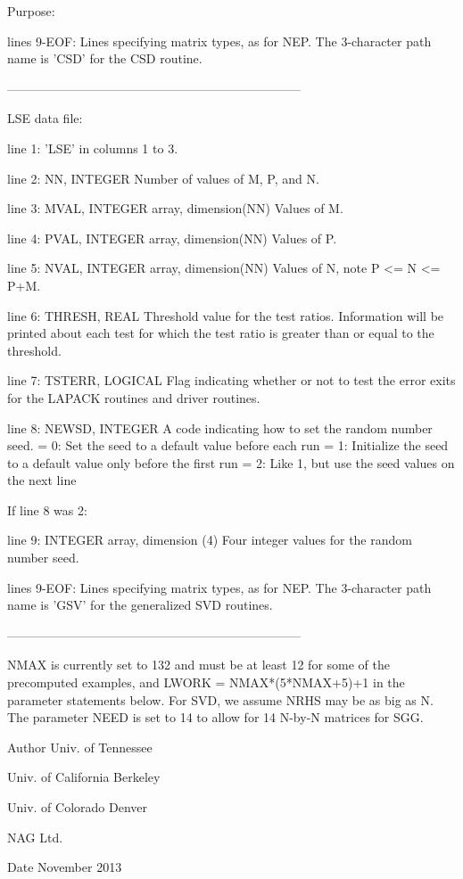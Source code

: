 \begin{DoxyParagraph}{Purpose\+: }
\begin{DoxyVerb}
 lines 9-EOF:  Lines specifying matrix types, as for NEP.
          The 3-character path name is 'CSD' for the CSD routine.

-----------------------------------------------------------------------

 LSE data file:

 line 1:  'LSE' in columns 1 to 3.

 line 2:  NN, INTEGER
          Number of values of M, P, and N.

 line 3:  MVAL, INTEGER array, dimension(NN)
          Values of M.

 line 4:  PVAL, INTEGER array, dimension(NN)
          Values of P.

 line 5:  NVAL, INTEGER array, dimension(NN)
          Values of N, note P <= N <= P+M.

 line 6:  THRESH, REAL
          Threshold value for the test ratios.  Information will be
          printed about each test for which the test ratio is greater
          than or equal to the threshold.

 line 7:  TSTERR, LOGICAL
          Flag indicating whether or not to test the error exits for
          the LAPACK routines and driver routines.

 line 8:  NEWSD, INTEGER
          A code indicating how to set the random number seed.
          = 0:  Set the seed to a default value before each run
          = 1:  Initialize the seed to a default value only before the
                first run
          = 2:  Like 1, but use the seed values on the next line

 If line 8 was 2:

 line 9:  INTEGER array, dimension (4)
          Four integer values for the random number seed.

 lines 9-EOF:  Lines specifying matrix types, as for NEP.
          The 3-character path name is 'GSV' for the generalized
          SVD routines.

-----------------------------------------------------------------------

 NMAX is currently set to 132 and must be at least 12 for some of the
 precomputed examples, and LWORK = NMAX*(5*NMAX+5)+1 in the parameter
 statements below.  For SVD, we assume NRHS may be as big as N.  The
 parameter NEED is set to 14 to allow for 14 N-by-N matrices for SGG.\end{DoxyVerb}
 
\end{DoxyParagraph}
\begin{DoxyAuthor}{Author}
Univ. of Tennessee 

Univ. of California Berkeley 

Univ. of Colorado Denver 

N\+A\+G Ltd. 
\end{DoxyAuthor}
\begin{DoxyDate}{Date}
November 2013 
\end{DoxyDate}
\hypertarget{group__single__eig_ga9f423a19ff92049fe736bf71a7bfa7c7}{}
